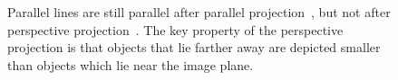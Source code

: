 \begin{figure}
\centering
{}
\caption[View frustum, canonical cube]{Parallel lines are still parallel
after parallel projection~, but not
after perspective projection~.
The key property of the perspective projection is that objects that lie
farther away are depicted smaller than objects which lie near the image plane.}
\label{fig:projections2d}
\end{figure}

